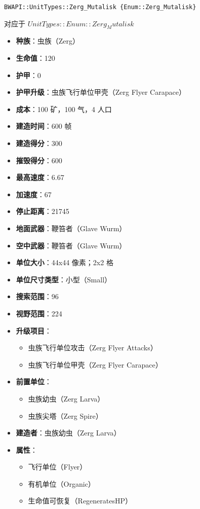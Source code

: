 \begin{tcolorbox}[colback=white, colframe=black!60!white, title=Zerg\_Mutalisk(), arc=0mm]
    \begin{verbatim}
BWAPI::UnitTypes::Zerg_Mutalisk {Enum::Zerg_Mutalisk}
    \end{verbatim}
    对应于  $ UnitTypes::Enum::Zerg_Mutalisk $ 
    \begin{itemize}
        \item \textbf{种族}：虫族（Zerg）
        \item \textbf{生命值}：120
        \item \textbf{护甲}：0
        \item \textbf{护甲升级}：虫族飞行单位甲壳（Zerg Flyer Carapace）
        \item \textbf{成本}：100 矿，100 气，4 人口
        \item \textbf{建造时间}：600 帧
        \item \textbf{建造得分}：300
        \item \textbf{摧毁得分}：600
        \item \textbf{最高速度}：6.67
        \item \textbf{加速度}：67
        \item \textbf{停止距离}：21745
        \item \textbf{地面武器}：鞭笞者（Glave Wurm）
        \item \textbf{空中武器}：鞭笞者（Glave Wurm）
        \item \textbf{单位大小}：44x44 像素；2x2 格
        \item \textbf{单位尺寸类型}：小型（Small）
        \item \textbf{搜索范围}：96
        \item \textbf{视野范围}：224
        \item \textbf{升级项目}：
            \begin{itemize}
                \item 虫族飞行单位攻击（Zerg Flyer Attacks）
                \item 虫族飞行单位甲壳（Zerg Flyer Carapace）
            \end{itemize}
        \item \textbf{前置单位}：
            \begin{itemize}
                \item 虫族幼虫（Zerg Larva）
                \item 虫族尖塔（Zerg Spire）
            \end{itemize}
        \item \textbf{建造者}：虫族幼虫（Zerg Larva）
        \item \textbf{属性}：
            \begin{itemize}
                \item 飞行单位（Flyer）
                \item 有机单位（Organic）
                \item 生命值可恢复（RegeneratesHP）
            \end{itemize}
    \end{itemize}
\end{tcolorbox}

